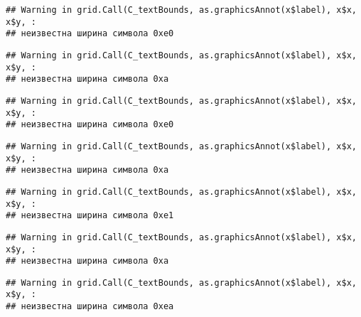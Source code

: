 \documentclass[
]{article}
\newenvironment{Shaded}{\begin{snugshade}}{\end{snugshade}}
\newcommand{\DataTypeTok}[1]{\textcolor[rgb]{0.13,0.29,0.53}{#1}}
\newcommand{\KeywordTok}[1]{\textcolor[rgb]{0.13,0.29,0.53}{\textbf{#1}}}
\newcommand{\NormalTok}[1]{#1}
\newcommand{\OperatorTok}[1]{\textcolor[rgb]{0.81,0.36,0.00}{\textbf{#1}}}
\newcommand{\StringTok}[1]{\textcolor[rgb]{0.31,0.60,0.02}{#1}}
\begin{document}
\begin{Shaded}
\end{Shaded}

\begin{verbatim}
## Warning in grid.Call(C_textBounds, as.graphicsAnnot(x$label), x$x, x$y, :
## неизвестна ширина символа 0xe0
\end{verbatim}

\begin{verbatim}
## Warning in grid.Call(C_textBounds, as.graphicsAnnot(x$label), x$x, x$y, :
## неизвестна ширина символа 0xa
\end{verbatim}

\begin{verbatim}
## Warning in grid.Call(C_textBounds, as.graphicsAnnot(x$label), x$x, x$y, :
## неизвестна ширина символа 0xe0
\end{verbatim}

\begin{verbatim}
## Warning in grid.Call(C_textBounds, as.graphicsAnnot(x$label), x$x, x$y, :
## неизвестна ширина символа 0xa
\end{verbatim}

\begin{verbatim}
## Warning in grid.Call(C_textBounds, as.graphicsAnnot(x$label), x$x, x$y, :
## неизвестна ширина символа 0xe1
\end{verbatim}

\begin{verbatim}
## Warning in grid.Call(C_textBounds, as.graphicsAnnot(x$label), x$x, x$y, :
## неизвестна ширина символа 0xa
\end{verbatim}

\begin{verbatim}
## Warning in grid.Call(C_textBounds, as.graphicsAnnot(x$label), x$x, x$y, :
## неизвестна ширина символа 0xea
\end{verbatim}
\end{document}
